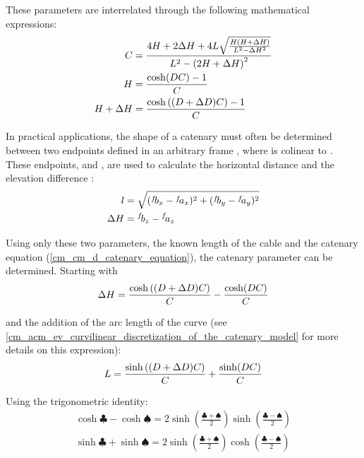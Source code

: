 These parameters are interrelated through the following mathematical expressions:
\begin{align}
	C          & = \frac{4H + 2\Delta H + 4L \sqrt{\frac{H(H + \Delta H)}{L^2 - \Delta H^2}}}{L^2 - \left(2H + \Delta H\right)^2} \\
	H          & = \frac{\cosh(DC) - 1}{C}                                                                                                \\
	H + \Delta H & = \frac{\cosh\left((D + \Delta D)C\right) - 1}{C}
\end{align}

In practical applications, the shape of a catenary must often be determined between two endpoints
defined in an arbitrary frame , where  is colinear to . These
endpoints,  and , are used to calculate the horizontal distance \catl{}
and the elevation difference \catdH{}:
\begin{align}
	\catl  & = \sqrt{(\ldcoord{b}{f}{x} - \ldcoord{a}{f}{x})^2 + (\ldcoord{b}{f}{y} - \ldcoord{a}{f}{y})^2} \\
	\catdH & = \ldcoord{b}{f}{z} - \ldcoord{a}{f}{z}
\end{align}

Using only these two parameters, the known length of the cable \catL{} and the catenary equation
(\cref{cm_cm_d_catenary_equation}), the catenary parameter \catC{} can be determined. Starting with
\begin{align}
	\Delta H = \frac{\cosh{\left((\ensuremath{D}+ \ensuremath{\Delta D})\ensuremath{C}\right)}}{C} - \frac{\cosh(DC)}{C}
	\label{cm_cm_pd_dH}
\end{align}

and the addition of the arc length of the curve (see
\cref{cm_acm_ev_curvilinear_discretization_of_the_catenary_model} for more details on this
expression):
\begin{align}
	L = \frac{\sinh\left((D + \Delta D)C\right)}{C} + \frac{\sinh(DC)}{C}
	\label{cm_cm_pd_L}
\end{align}

Using the trigonometric identity:
\begin{align}
	\cosh{\clubsuit}-\cosh{\spadesuit}=2\sinh{\left(\frac{\clubsuit+\spadesuit}{2}\right)}\sinh{\left(\frac{\clubsuit-\spadesuit}{2}\right)} \\
	\sinh{\clubsuit}+\sinh{\spadesuit}=2\sinh{\left(\frac{\clubsuit+\spadesuit}{2}\right)}\cosh{\left(\frac{\clubsuit-\spadesuit}{2}\right)}
\end{align}

